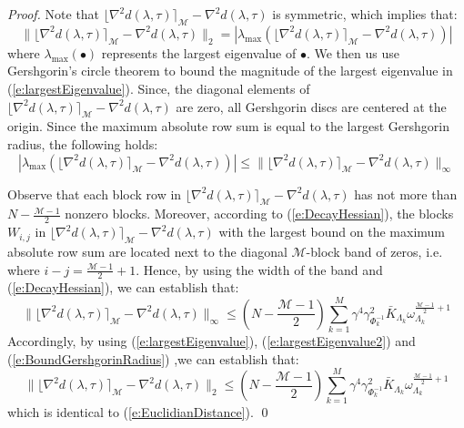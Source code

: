 \begin{proof}
Note that $\lfloor \nabla^2 d(\lambda, \tau) \rceil_{\mathcal{M}} - \nabla^2 d(\lambda, \tau)$ is symmetric, which implies that:
\begin{equation} \label{e:largestEigenvalue}
\| \lfloor \nabla^2 d(\lambda, \tau) \rceil_{\mathcal{M}} - \nabla^2 d(\lambda, \tau) \|_2 = | \lambda_{\max} ( \lfloor \nabla^2 d(\lambda, \tau) \rceil_{\mathcal{M}} - \nabla^2 d(\lambda, \tau) ) |
\end{equation}
where $\lambda_{\max}(\bullet)$ represents the largest eigenvalue of $\bullet$. We then us use Gershgorin's circle theorem to bound the magnitude of the largest eigenvalue in (\ref{e:largestEigenvalue}). Since, the diagonal elements of $\lfloor \nabla^2 d(\lambda, \tau) \rceil_{\mathcal{M}} - \nabla^2 d(\lambda, \tau)$ are zero, all Gershgorin discs are centered at the origin. Since the maximum absolute row sum is equal to the largest Gershgorin radius, the following holds:
\begin{equation} \label{e:largestEigenvalue2}
| \lambda_{\max} ( \lfloor \nabla^2 d(\lambda, \tau) \rceil_{\mathcal{M}} - \nabla^2 d(\lambda, \tau) ) | \leq \| \lfloor \nabla^2 d(\lambda, \tau) \rceil_{\mathcal{M}} - \nabla^2 d(\lambda, \tau) \|_{\infty}
\end{equation}

Observe that each block row in $ \lfloor \nabla^2 d(\lambda, \tau) \rceil_{\mathcal{M}} - \nabla^2 d(\lambda, \tau)$ has not more than $N -\frac{\mathcal{M} - 1}{2}$ nonzero blocks. Moreover, according to (\ref{e:DecayHessian}), the blocks $W_{i,j}$ in $\lfloor \nabla^2 d(\lambda, \tau) \rceil_{\mathcal{M}} - \nabla^2 d(\lambda, \tau)$ with the largest bound on the maximum absolute row sum are located next to the diagonal $\mathcal{M}$-block band of zeros, i.e. where $i - j = \frac{\mathcal{M} - 1}{2} + 1$. Hence, by using the width of the band and (\ref{e:DecayHessian}), we can establish that:
\begin{equation} \label{e:BoundGershgorinRadius}
\| \lfloor \nabla^2 d(\lambda, \tau) \rceil_{\mathcal{M}} - \nabla^2 d(\lambda, \tau) \|_{\infty} \leq \left( N -\frac{\mathcal{M} - 1}{2} \right) \sum_{k=1}^M \gamma^4 \gamma_{\Phi_k^{-1}}^2 \bar{K}_{\Lambda_k} \omega_{\Lambda_k}^{\frac{\mathcal{M} - 1}{2} + 1}
\end{equation}
Accordingly, by using (\ref{e:largestEigenvalue}), (\ref{e:largestEigenvalue2}) and (\ref{e:BoundGershgorinRadius}) ,we can establish that:
\begin{equation} 
\| \lfloor \nabla^2 d(\lambda, \tau) \rceil_{\mathcal{M}} - \nabla^2 d(\lambda, \tau) \|_2 \leq \left( N -\frac{\mathcal{M} - 1}{2} \right) \sum_{k=1}^M \gamma^4 \gamma_{\Phi_k^{-1}}^2 \bar{K}_{\Lambda_k} \omega_{\Lambda_k}^{\frac{\mathcal{M} - 1}{2} + 1}
\end{equation}
which is identical to (\ref{e:EuclidianDistance}).
\qed
\end{proof}
